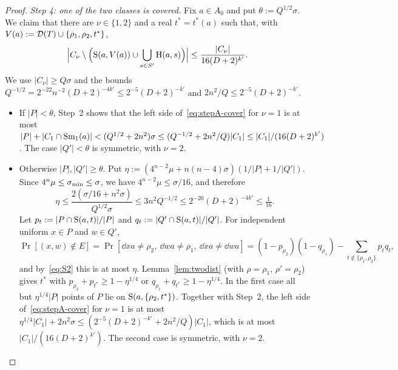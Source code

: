 \begin{proof}
\emph{Step 4: one of the two classes is covered.} Fix $a\in A_0$ and put $\theta:=Q^{1/2}\sigma$. We claim that there are
$\nu\in\{1,2\}$ and a real $t^\ast=t^\ast(a)$ such that, with $V(a):=\mathcal{D}(T)\cup\{\rho_1,\rho_2,t^\ast\}$,
\begin{equation}\label{eq:stepA-cover}
\Bigl|C_\nu\setminus\Bigl(\mathrm{S}(a,V(a))\cup\bigcup_{s\in S'}\mathrm{H}(a,s)\Bigr)\Bigr|\le\frac{|C_\nu|}{16(D+2)^{k'}} .
\end{equation}
We use $|C_\nu|\ge Q\sigma$ and the bounds $Q^{-1/2}=2^{-22}n^{-2}(D+2)^{-4k'}\le2^{-5}(D+2)^{-k'}$ and
$2n^2/Q\le2^{-5}(D+2)^{-k'}$.
\begin{itemize}[leftmargin=1.5em]
\item If $|P|<\theta$, Step~2 shows that the left side of~\eqref{eq:stepA-cover} for $\nu=1$ is at most
  $|P|+|C_1\cap\mathrm{Sm}_1(a)|<(Q^{1/2}+2n^2)\sigma\le(Q^{-1/2}+2n^2/Q)|C_1|\le|C_1|/(16(D+2)^{k'})$. The case $|Q'|<\theta$
  is symmetric, with $\nu=2$.
\item Otherwise $|P|,|Q'|\ge\theta$. Put $\eta:=(4^{n-2}\mu+n(n-4)\sigma)(1/|P|+1/|Q'|)$. Since
  $4^n\mu\le\sigma_{\min}\le\sigma$, we have $4^{n-2}\mu\le\sigma/16$, and therefore
  \[
  \eta\le\frac{2(\sigma/16+n^2\sigma)}{Q^{1/2}\sigma}\le 3n^2Q^{-1/2}\le2^{-20}(D+2)^{-4k'}\le\tfrac1{16}.
  \]
  Let $p_t:=|P\cap\mathrm{S}(a,t)|/|P|$ and $q_t:=|Q'\cap\mathrm{S}(a,t)|/|Q'|$. For independent uniform $x\in P$ and $w\in Q'$,
  \[
  \Pr[(x,w)\notin E]=\Pr[\dd xa\ne\rho_2,\ \dd wa\ne\rho_1,\ \dd xa\ne\dd wa]
  =(1-p_{\rho_2})(1-q_{\rho_1})-\sum_{t\notin\{\rho_1,\rho_2\}}p_tq_t,
  \]
  and by~\eqref{eq:S2} this is at most $\eta$. Lemma~\ref{lem:twodist} (with $\rho=\rho_1$, $\rho'=\rho_2$) gives
  $t^\ast$ with $p_{\rho_2}+p_{t^\ast}\ge1-\eta^{1/4}$ or $q_{\rho_1}+q_{t^\ast}\ge1-\eta^{1/4}$. In the first case all but
  $\eta^{1/4}|P|$ points of $P$ lie on $\mathrm{S}(a,\{\rho_2,t^\ast\})$. Together with Step~2, the left side
  of~\eqref{eq:stepA-cover} for $\nu=1$ is at most $\eta^{1/4}|C_1|+2n^2\sigma\le(2^{-5}(D+2)^{-k'}+2n^2/Q)|C_1|$,
  which is at most $|C_1|/(16(D+2)^{k'})$. The second case is symmetric, with $\nu=2$.
\end{itemize}


\end{proof}
